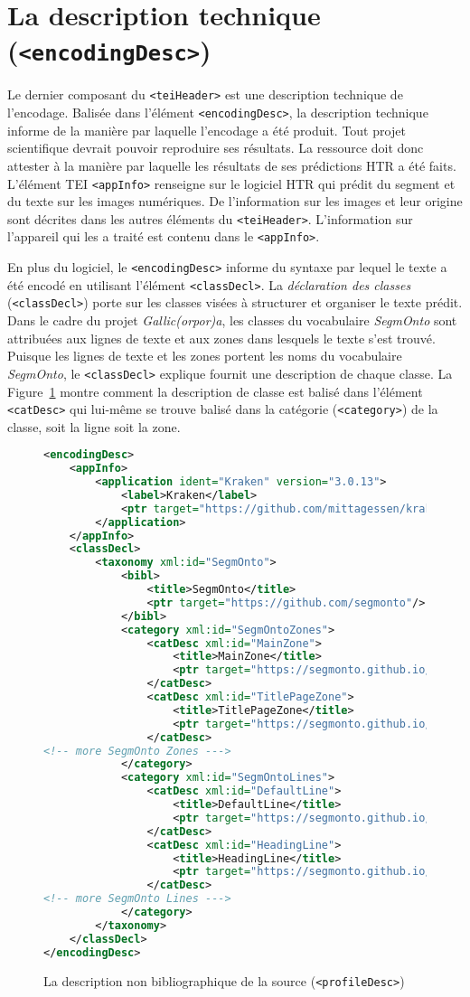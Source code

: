 \documentclass[class=article, crop=false]{standalone}
\begin{document}
\section{La description technique (\texttt{<encodingDesc>})}
Le dernier composant du \texttt{<teiHeader>} est une description technique de l'encodage. Balisée dans l'élément \texttt{<encodingDesc>}, la description technique informe de la manière par laquelle l'encodage a été produit. Tout projet scientifique devrait pouvoir reproduire ses résultats. La ressource doit donc attester à la manière par laquelle les résultats de ses prédictions \acrshort{HTR} a été faits. L'élément \acrshort{TEI} \texttt{<appInfo>} renseigne sur le logiciel \acrshort{HTR} qui prédit du segment et du texte sur les images numériques. De l'information sur les images et leur origine sont décrites dans les autres éléments du \texttt{<teiHeader>}. L'information sur l'appareil qui les a traité est contenu dans le \texttt{<appInfo>}.

En plus du logiciel, le \texttt{<encodingDesc>} informe du syntaxe par lequel le texte a été encodé en utilisant l'élément \texttt{<classDecl>}. La \textit{déclaration des classes} (\texttt{<classDecl>}) porte sur les classes visées à structurer et organiser le texte prédit. Dans le cadre du projet \textit{Gallic(orpor)a}, les classes du vocabulaire \textit{SegmOnto} sont attribuées aux lignes de texte et aux zones dans lesquels le texte s'est trouvé. Puisque les lignes de texte et les zones portent les noms du vocabulaire \textit{SegmOnto}, le \texttt{<classDecl>} explique fournit une description de chaque classe. La Figure~\ref{fig:profileDesc} montre comment la description de classe est balisé dans l'élément \texttt{<catDesc>} qui lui-même se trouve balisé dans la catégorie (\texttt{<category>}) de la classe, soit la ligne soit la zone.

\begin{figure}[htp]
\centering
\begin{lstlisting}[language=XML]
<encodingDesc>
	<appInfo>
		<application ident="Kraken" version="3.0.13">
			<label>Kraken</label>
			<ptr target="https://github.com/mittagessen/kraken"/>
		</application>
	</appInfo>
	<classDecl>
		<taxonomy xml:id="SegmOnto">
			<bibl>
				<title>SegmOnto</title>
				<ptr target="https://github.com/segmonto"/>
			</bibl>
			<category xml:id="SegmOntoZones">
				<catDesc xml:id="MainZone">
					<title>MainZone</title>
					<ptr target="https://segmonto.github.io/gd/gdZ/MainZone"/>
				</catDesc>
				<catDesc xml:id="TitlePageZone">
					<title>TitlePageZone</title>
					<ptr target="https://segmonto.github.io/gd/gdZ/TitlePageZone"/>
				</catDesc>
<!-- more SegmOnto Zones --->
			</category>
			<category xml:id="SegmOntoLines">
				<catDesc xml:id="DefaultLine">
					<title>DefaultLine</title>
					<ptr target="https://segmonto.github.io/gd/gdL/DefaultLine"/>
				</catDesc>
				<catDesc xml:id="HeadingLine">
					<title>HeadingLine</title>
					<ptr target="https://segmonto.github.io/gd/gdL/HeadingLine"/>
				</catDesc>
<!-- more SegmOnto Lines --->
			</category>
		</taxonomy>
	</classDecl>
</encodingDesc>
\end{lstlisting}
\caption{La description non bibliographique de la source (\texttt{<profileDesc>})}
\label{fig:profileDesc}
\end{figure}
\end{document}
